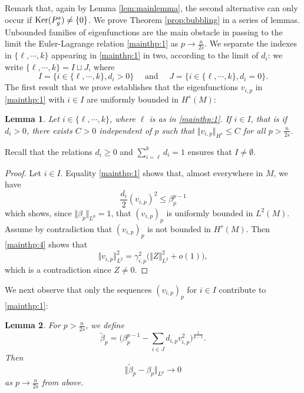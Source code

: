 \documentclass[10pt]{amsart}
\numberwithin{equation}{section}
\def\ker{{\mathop{\rm Ker}}}
\theoremstyle{plain}
\newtheorem{lemme}{Lemma}[section]%
\theoremstyle{remark}
\begin{document}
Remark that, again by Lemma \ref{lem:mainlemma}, the second alternative can only occur if $\ker(P_g^s) \neq \{0\}$. We prove Theorem \ref{prop:bubbling} in a series of lemmas. Unbounded families of eigenfunctions are the main obstacle in passing to the limit the Euler-Lagrange relation \eqref{mainthp:1} as $p \to \frac{n}{2s}$. We separate the indexes in $\{\ell, \cdots, k\}$ appearing in \eqref{mainthp:1} in two, according to the limit of $d_i$: we write $ \{\ell, \cdots, k\} = I \sqcup J$, where 
\begin{equation} \label{defIandJ}
I = \big \{ i \in\{\ell, \cdots, k\}, d_i >0  \big \} \quad \text{ and } \quad J = \big \{ i \in\{\ell, \cdots, k\}, d_i =0  \big \}.
\end{equation}
The first result that we prove establishes that the eigenfunctions $v_{i,p}$ in \eqref{mainthp:1} with $i \in I$ are uniformly bounded in $H^s(M)$:
\begin{lemme} \label{vkqbounded} 
Let $i \in \{\ell, \cdots, k\}$, where $\ell$ is as in \eqref{mainthp:1}. If $i \in I$, that is if $d_i >0$, there exists $C >0$ independent of $p$ such that $\Vert v_{i,p} \Vert_{H^s} \le C$ for all $p > \frac{n}{2s}$. 
\end{lemme}
Recall that the relations $d_i \ge0$ and  $\sum_{i=\ell}^k d_i  =1$ ensures that $I \neq \emptyset$. 

\begin{proof}
Let $i \in I$. Equality \eqref{mainthp:1} shows that, almost everywhere in $M$, we have 
\begin{equation} \label{euler_eq_w2}
  \frac{d_i}{2} (v_{i,p})^2 \leq \beta_p^{p-1}
\end{equation}
which shows, since $\Vert \beta_p \Vert_{L^p} = 1$, that $(v_{i,p})_{p}$ is uniformly bounded in $L^2(M)$. Assume by contradiction that $(v_{i,p})_p$ is not bounded in $H^s(M)$. Then \eqref{mainthp:4} shows that 
$$ \Vert v_{i,p} \Vert_{L^2}^2 = \gamma_{i,p}^2 \big( \Vert Z \Vert_{L^2}^2 + o(1) \big), $$
which is a contradiction since $Z \neq 0$. 
\end{proof}
We next observe that only the sequences $(v_{i,p})_p$ for $i \in I$ contribute to \eqref{mainthp:1}:
\begin{lemme} \label{lemme:tildebeta}
For $p > \frac{n}{2s}$, we define 
\begin{equation} \label{mainthp:5}
\tilde{\beta}_p = \Big( \beta_p^{p-1} - \sum_{i \in J}d_{i,p} v_{i,p}^2 \Big)^{\frac{1}{p-1}}. 
\end{equation}
Then 
\begin{equation} \label{mainthp:6}
\Vert \tilde{\beta}_p - \beta_p \Vert_{L^p} \to 0 
\end{equation}
as $p \to \frac{n}{2s}$ from above. 
\end{lemme}
\end{document}
